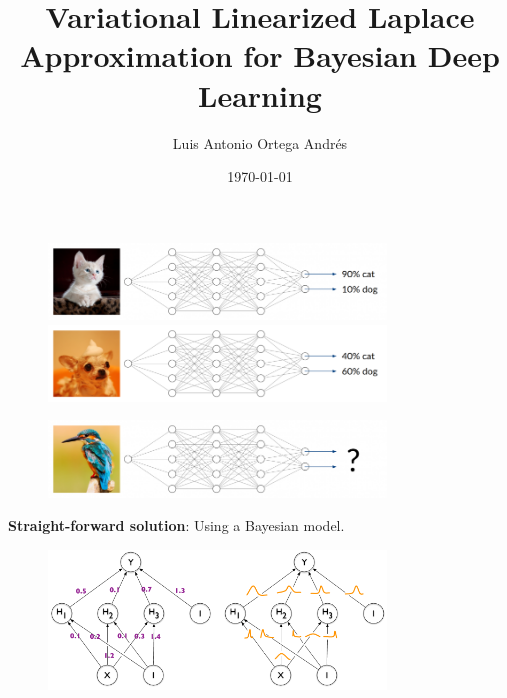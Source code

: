 \documentclass[aspectratio=149]{beamer}
\title{Variational Linearized Laplace Approximation for Bayesian Deep Learning}
\date{\today}
\author{Luis Antonio Ortega Andrés}
\institute{Autonomous University of Madrid}
\begin{document}
  \maketitle


    {
      \begin{frame}{}
        \begin{figure}
            \centering
            \includegraphics[width = 0.8\textwidth]{slides_imgs/Bildschirmfoto-vom-2019-10-01-11-03-08-768x175.png}
            \includegraphics[width = 0.8\textwidth]{slides_imgs/uncertainty-quantification-dog-768x175.png}
            \label{fig:my_label}
        \end{figure}
    \end{frame}}
    
    {
      \begin{frame}{}
        \begin{figure}
            \centering
            \includegraphics[width = 0.8\textwidth]{slides_imgs/Bildschirmfoto-vom-2019-10-01-11-03-18-768x175.png}
            \label{fig:my_label}
        \end{figure}
    
    \end{frame}}
    
    {
      \begin{frame}{}
      \textbf{Straight-forward solution}: Using a Bayesian model.
        \begin{figure}
            \centering
            \includegraphics[width = 0.8\textwidth]{slides_imgs/Bayesian-Neural-Network.png}
            \label{fig:my_label}
        \end{figure}
    \end{frame}}
\end{document}
